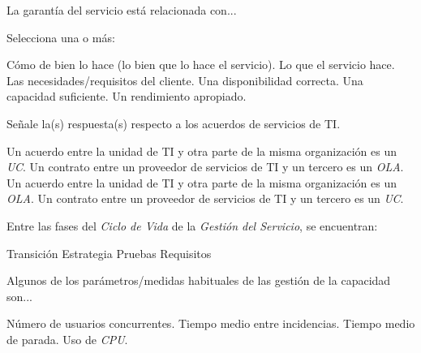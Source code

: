 \documentclass[a4paper]{exam}
\begin{document}
 \vspace{0.5cm}

 \vspace{1cm}

\begin{questions}

  \question La garantía del servicio está relacionada con...

  Selecciona una o más:

  \begin{checkboxes}
    \CorrectChoice Cómo de bien lo hace (lo bien que lo hace el servicio).
    \choice Lo que el servicio hace.
    \choice Las necesidades/requisitos del cliente.
    \CorrectChoice Una disponibilidad correcta.
    \CorrectChoice Una capacidad suficiente.
    \choice Un rendimiento apropiado.
  \end{checkboxes}

  \question Señale la(s) respuesta(s) respecto a los acuerdos de
  servicios de TI.

  \begin{checkboxes}
    \choice Un acuerdo entre la unidad de TI y otra parte de la misma
    organización es un \emph{UC}.
    \choice Un contrato entre un proveedor de servicios de TI y un
    tercero es un \emph{OLA}.
    \CorrectChoice Un acuerdo entre la unidad de TI y otra parte de la
    misma organización es un \emph{OLA}.
    \CorrectChoice Un contrato entre un proveedor de servicios de TI y
    un tercero es un \emph{UC}.
  \end{checkboxes}

  \question Entre las fases del \emph{Ciclo de Vida} de la
  \emph{Gestión del Servicio}, se encuentran:

  \begin{checkboxes}
    \CorrectChoice Transición
    \CorrectChoice Estrategia
    \choice Pruebas
    \choice Requisitos
  \end{checkboxes}

  \question Algunos de los parámetros/medidas habituales de las
  gestión de la capacidad son...

  \begin{checkboxes}
    \CorrectChoice Número de usuarios concurrentes.
    \choice Tiempo medio entre incidencias.
    \choice Tiempo medio de parada.
    \CorrectChoice Uso de \emph{CPU}.
  \end{checkboxes}


\end{questions}
\end{document}
